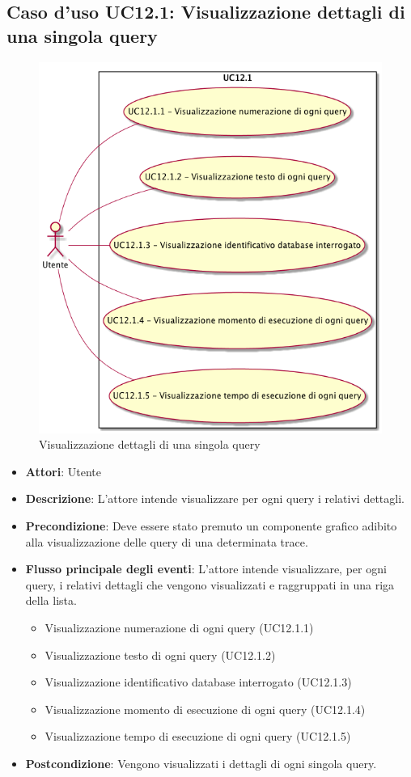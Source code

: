 \subsection{Caso d'uso UC12.1: Visualizzazione dettagli di una singola query}
\begin{figure} [H]
	\centering
	\includegraphics[scale=0.45]{./UC/UC12-1.png}
	\caption{Visualizzazione dettagli di una singola query}\label{}
\end{figure}
\begin{itemize}
	\item \textbf{Attori}: Utente
	\item \textbf{Descrizione}: L'attore intende visualizzare per ogni query i relativi dettagli.
	\item \textbf{Precondizione}: Deve essere stato premuto un componente grafico adibito alla visualizzazione delle query di una determinata trace.
	\item \textbf{Flusso principale degli eventi}: L'attore intende visualizzare, per ogni query, i relativi dettagli che vengono visualizzati e raggruppati in una riga della lista.
	\begin{itemize}
		\item Visualizzazione numerazione di ogni query (UC12.1.1)
		\item Visualizzazione testo di ogni query (UC12.1.2)
		\item Visualizzazione identificativo database interrogato (UC12.1.3)
		\item Visualizzazione momento di esecuzione di ogni query (UC12.1.4)
		\item Visualizzazione tempo di esecuzione di ogni query (UC12.1.5)
	\end{itemize}
	\item \textbf{Postcondizione}: Vengono visualizzati i dettagli di ogni singola query.
\end{itemize}
